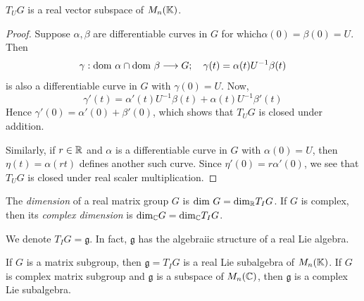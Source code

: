 \begin{proposition}
  \(T_UG\) is a real vector subspace of \(M_n(\mathbb{K})\).
\end{proposition}

\begin{proof}
  Suppose \(\alpha,\beta\) are differentiable curves in \(G\) for which\(\alpha(0)=\beta(0)=U\).
  Then
  \[ \gamma:\text{dom }\alpha\cap\text{dom }\beta\longrightarrow G;\hspace{10px}\gamma(t)=\alpha(t)U^{-1}\beta(t) \]
  is also a differentiable curve in \(G\) with \(\gamma(0)=U\). Now,
  \[ \gamma'(t)=\alpha'(t)U^{-1}\beta(t)+\alpha(t)U^{-1}\beta'(t) \]
  Hence \(\gamma'(0)=\alpha'(0)+\beta'(0)\), which shows that \(T_UG\) is closed under addition.

  Similarly, if \(r\in\mathbb{R}\) and \(\alpha\) is a differentiable curve in \(G\) with \(\alpha(0)=U\),
  then \(\eta(t)=\alpha(rt)\) defines another such curve. Since \(\eta'(0)=r\alpha'(0)\),
  we see that \(T_UG\) is closed under real scaler multiplication.
\end{proof}

\begin{definition}
  The {\it dimension} of a real matrix group \(G\) is \(\text{dim }G=\text{dim}_{\mathbb{R}}T_IG\).
  If \(G\) is complex, then its {\it complex dimension} is \(\text{dim}_{\mathbb{C}}G=\text{dim}_{\mathbb{C}}T_IG\).
\end{definition}

We denote \(T_IG=\mathfrak{g}\). In fact, \(\mathfrak{g}\) has the algebraiic structure of a
real Lie algebra.

\begin{theorem}
  If \(G\) is a matrix subgroup, then \(\mathfrak{g}=T_IG\) is a real Lie subalgebra of
  \(M_n(\mathbb{K})\). If \(G\) is complex matrix subgroup and \(\mathfrak{g}\) is a subspace of \(M_n(\mathbb{C})\),
  then \(\mathfrak{g}\) is a complex Lie subalgebra.
  \label{thm:lie}
\end{theorem}

